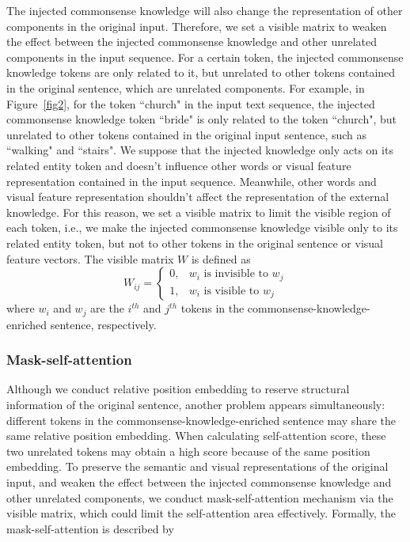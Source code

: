 \documentclass[conference]{IEEEtran}
\begin{document}
The injected commonsense knowledge will also change the representation of other components in the original input. Therefore, we set a visible matrix to weaken the effect between the injected commonsense knowledge and other unrelated components in the input sequence. For a certain token, the injected commonsense knowledge tokens are only related to it, but unrelated to other tokens contained in the original sentence, which are unrelated components. For example, in Figure~\ref{fig2}, for the token “church" in the input text sequence, the injected commonsense knowledge token “bride" is only related to the token “church", but unrelated to other tokens contained in the original input sentence, such as “walking" and “stairs". We suppose that the injected knowledge only acts on its related entity token and doesn't influence  other words or visual feature representation contained in the input sequence. Meanwhile, other words and visual feature representation shouldn't affect the representation of the external knowledge. For this reason, we set a visible matrix to limit the visible region of each token, i.e., we make the injected commonsense knowledge visible only to its related entity token, but not to other tokens in the original sentence or visual feature vectors. The visible matrix $W$ is defined as 
\begin{equation}
W_{i j}=\left\{\begin{array}{ll}
0, & w_{i} \text { is invisible to } w_{j} \\
1, & w_{i} \text { is visible to } w_{j}
\end{array}\right.
\label{eq1}
\end{equation}
where $w_i$ and $w_j$ are the $i^{th}$ and $j^{th}$ tokens in the commonsense-knowledge-enriched sentence, respectively. \subsubsection{Mask-self-attention}


Although we conduct relative position embedding to reserve structural information of the original sentence, another problem appears simultaneously: different tokens in the commonsense-knowledge-enriched sentence may share the same relative position embedding. When calculating self-attention score, these two unrelated tokens may obtain a high score because of the same position embedding. To preserve the semantic and visual representations of the original input, and weaken the effect between the injected commonsense knowledge and other unrelated components, we conduct mask-self-attention mechanism via the visible matrix, which could limit the self-attention area effectively. Formally, the mask-self-attention is described by 
\end{document}

